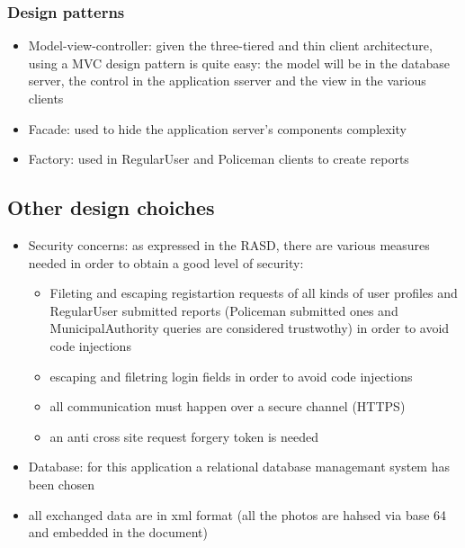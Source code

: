 \subsubsection{Design patterns}
\begin{itemize}
	\item Model-view-controller: given the three-tiered and thin client architecture, using a MVC design pattern is quite easy: the model will be in the database server, the control in the application sserver and the view in the various clients
	\item Facade: used to hide the application server's components complexity
	\item Factory: used in RegularUser and Policeman clients to create reports
\end{itemize}

\subsection{Other design choiches}
\begin{itemize}
	\item Security concerns: as expressed in the RASD, there are various measures needed in order to obtain a good level of security:
	\begin{itemize}
		\item Fileting and escaping registartion requests of all kinds of user profiles and RegularUser submitted reports (Policeman submitted ones and MunicipalAuthority queries are considered trustwothy) in order to avoid code injections
		\item escaping and filetring login fields in order to avoid code injections
		\item all communication must happen over a secure channel (HTTPS)
		\item an anti cross site request forgery token is needed 
	\end{itemize}
	\item Database: for this application a relational database managemant system has been chosen
	\item all exchanged data are in xml format (all the photos are hahsed via base 64 and embedded in the document)
\end{itemize}